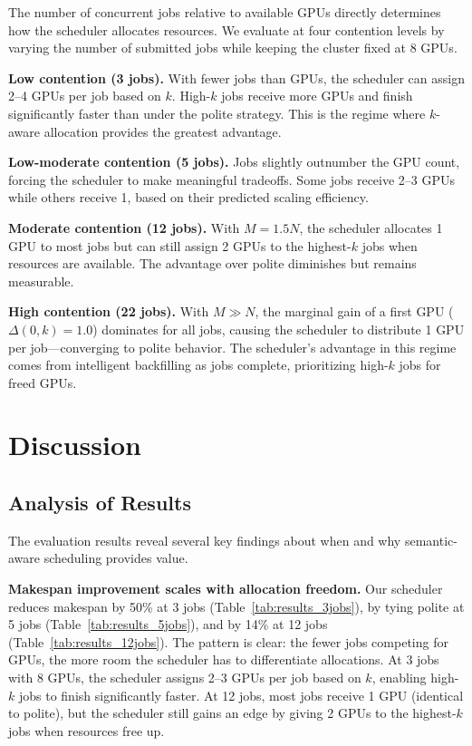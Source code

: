 \documentclass[letterpaper,10pt]{article}
\begin{document}
The number of concurrent jobs relative to available GPUs directly determines how the scheduler allocates resources. We evaluate at four contention levels by varying the number of submitted jobs while keeping the cluster fixed at 8 GPUs.

\textbf{Low contention (3 jobs).} With fewer jobs than GPUs, the scheduler can assign 2--4 GPUs per job based on $k$. High-$k$ jobs receive more GPUs and finish significantly faster than under the polite strategy. This is the regime where $k$-aware allocation provides the greatest advantage.

\textbf{Low-moderate contention (5 jobs).} Jobs slightly outnumber the GPU count, forcing the scheduler to make meaningful tradeoffs. Some jobs receive 2--3 GPUs while others receive 1, based on their predicted scaling efficiency.

\textbf{Moderate contention (12 jobs).} With $M = 1.5N$, the scheduler allocates 1 GPU to most jobs but can still assign 2 GPUs to the highest-$k$ jobs when resources are available. The advantage over polite diminishes but remains measurable.

\textbf{High contention (22 jobs).} With $M \gg N$, the marginal gain of a first GPU ($\Delta(0, k) = 1.0$) dominates for all jobs, causing the scheduler to distribute 1 GPU per job---converging to polite behavior. The scheduler's advantage in this regime comes from intelligent backfilling as jobs complete, prioritizing high-$k$ jobs for freed GPUs.

\section{Discussion}
\label{sec:discussion}

\subsection{Analysis of Results}

The evaluation results reveal several key findings about when and why semantic-aware scheduling provides value.

\textbf{Makespan improvement scales with allocation freedom.} Our scheduler reduces makespan by 50\% at 3 jobs (Table~\ref{tab:results_3jobs}), by tying polite at 5 jobs (Table~\ref{tab:results_5jobs}), and by 14\% at 12 jobs (Table~\ref{tab:results_12jobs}). The pattern is clear: the fewer jobs competing for GPUs, the more room the scheduler has to differentiate allocations. At 3 jobs with 8 GPUs, the scheduler assigns 2--3 GPUs per job based on $k$, enabling high-$k$ jobs to finish significantly faster. At 12 jobs, most jobs receive 1 GPU (identical to polite), but the scheduler still gains an edge by giving 2 GPUs to the highest-$k$ jobs when resources free up.
\end{document}
